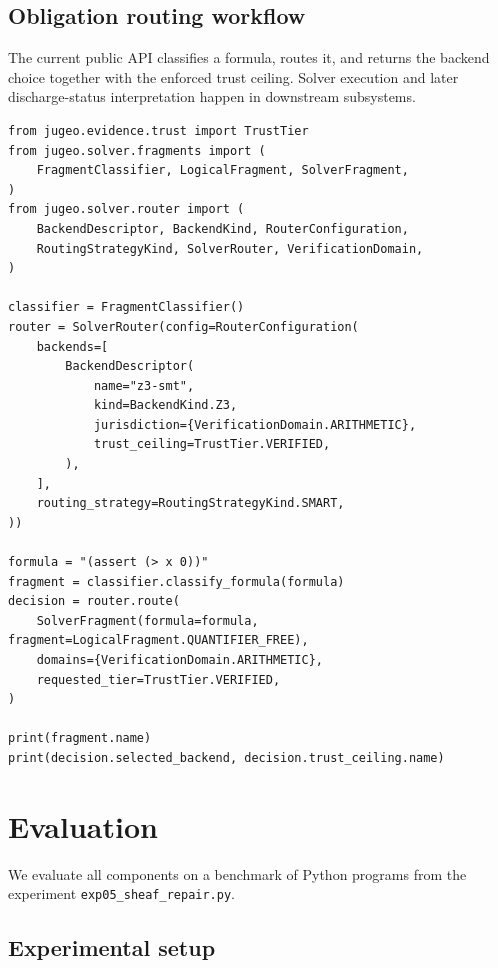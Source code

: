 \documentclass[11pt]{article}
\begin{document}
\subsection{Obligation routing workflow}\label{sec:api-discharge-flow}

The current public API classifies a formula, routes it, and returns the
backend choice together with the enforced trust ceiling.  Solver execution
and later discharge-status interpretation happen in downstream subsystems.

\begin{lstlisting}[caption={Classification followed by routing.},
                   label=lst:discharge-lifecycle]
from jugeo.evidence.trust import TrustTier
from jugeo.solver.fragments import (
    FragmentClassifier, LogicalFragment, SolverFragment,
)
from jugeo.solver.router import (
    BackendDescriptor, BackendKind, RouterConfiguration,
    RoutingStrategyKind, SolverRouter, VerificationDomain,
)

classifier = FragmentClassifier()
router = SolverRouter(config=RouterConfiguration(
    backends=[
        BackendDescriptor(
            name="z3-smt",
            kind=BackendKind.Z3,
            jurisdiction={VerificationDomain.ARITHMETIC},
            trust_ceiling=TrustTier.VERIFIED,
        ),
    ],
    routing_strategy=RoutingStrategyKind.SMART,
))

formula = "(assert (> x 0))"
fragment = classifier.classify_formula(formula)
decision = router.route(
    SolverFragment(formula=formula, fragment=LogicalFragment.QUANTIFIER_FREE),
    domains={VerificationDomain.ARITHMETIC},
    requested_tier=TrustTier.VERIFIED,
)

print(fragment.name)
print(decision.selected_backend, decision.trust_ceiling.name)
\end{lstlisting}


\section{Evaluation}\label{sec:evaluation}

We evaluate all components on a benchmark of \compTotalPrograms{} Python
programs from the experiment \texttt{exp05\_sheaf\_repair.py}.

\subsection{Experimental setup}\label{sec:eval-setup}
\end{document}
